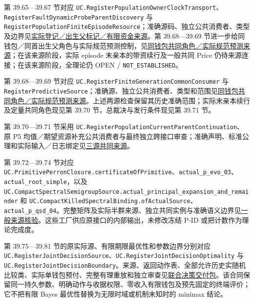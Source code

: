 \documentclass[
  11pt,
  oneside]{book}
\begin{document}
第 39.65---39.67 节对应 \nolinkurl{UC.RegisterPopulationOwnerClockTransport}、\nolinkurl{RegisterFaultDynamicProbeParentDiscovery} 与 \nolinkurl{RegisterPopulationFiniteEpisodeResource}；准确源码、独立公共消费者、类型及边界见\href{../formalization/ueot-core/docs/compression/theory_completion/unified_closure/owner_discovery_resource_source_v1/RESULTS_AND_OPEN_OBLIGATIONS.md}{实际登记／出生父标记／有限资金来源}。第 39.68---39.69 节进一步给同钱包／同首出生父角色与实际规范预测控制，见\href{../formalization/ueot-core/docs/compression/theory_completion/unified_closure/finite_predictive_source_v1/RESULTS_AND_OPEN_OBLIGATIONS.md}{同钱包共同角色／实际规范预测来源}；在该来源阶段，实际 episode 末亲本的带资续行及一般共同 Price 仍待来源连接；在该来源阶段，全理论仍 OPEN / \nolinkurl{NOT_ESTABLISHED}。

第 39.68---39.69 节对应 \nolinkurl{UC.RegisterFiniteGenerationCommonConsumer} 与 \nolinkurl{RegisterPredictiveSource}；准确源、独立公共消费者、类型和范围见\href{../formalization/ueot-core/docs/compression/theory_completion/unified_closure/finite_predictive_source_v1/RESULTS_AND_OPEN_OBLIGATIONS.md}{同钱包共同角色／实际规范预测来源}。上述两源检查保留其历史准确范围；实际末亲本续行及定量共同角色现见第 39.70 节，总裁决与发行条件现见第 39.71 节。

第 39.70---39.71 节采用 \nolinkurl{UC.RegisterPopulationCurrentParentContinuation}、原 P5 均值／期望资源补充公共消费者与最终独立跨接口审查；准确声明、标准公理和实际输入／日志绑定见\href{../formalization/ueot-core/docs/compression/theory_completion/unified_closure/finite_predictive_source_v1/SOURCE_VALIDATION.json}{三源共同来源}。

第 39.72---39.74 节对应 \nolinkurl{UC.PrimitivePerronClosure.certificateOfPrimitive}、\nolinkurl{actual_p_evo_03}、\nolinkurl{actual_root_simple}，以及 \nolinkurl{UC.CompactSpectralSemigroupSource.actual_principal_expansion_and_remainder} 和 \nolinkurl{UC.CompactKilledSpectralBinding.ofActualSource}、\nolinkurl{actual_p_qsd_04}。完整矩阵及实际半群来源、独立共同实例与准确语义边界见\href{../formalization/ueot-core/docs/compression/theory_completion/unified_closure/general_perron_compact_spectral_source_v1/SOURCE_VALIDATION.json}{一般来源核验}。这些工厂供应原接口的内部输出，未修改冻结 P-ID 或把计数作为理论完成度。

第 39.75---39.81 节的原实际源、有限期限最优性和参数边界分别对应 \nolinkurl{UC.RegisterJointDecisionSource}、\nolinkurl{UC.RegisterJointDecisionOptimality} 与 \nolinkurl{UC.RegisterJointDecisionBoundary}。来源、返回动作表、全部允许历史实随机比较类、实际单钱包预付、完整有理重放和独立审查见\href{../formalization/ueot-core/docs/compression/theory_completion/unified_closure/joint_decision_closure_v1/README.md}{联合决策交付包}。该合同保留同一持久参数、明确动作与收据权限、零收入有限钱包及预先固定的终端评价；它不把有限 Bayes 最优性替换为无限时域或机制未知时的 minimax 结论。
\end{document}
